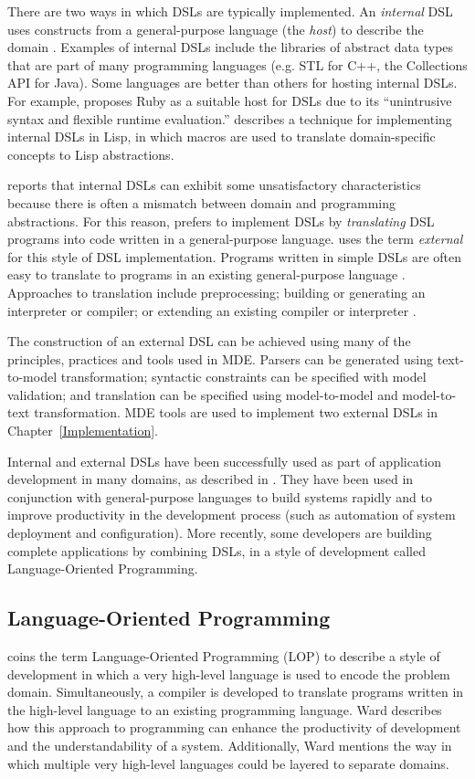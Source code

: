 There are two ways in which DSLs are typically implemented. An \emph{internal} DSL uses constructs from a general-purpose language (the \emph{host}) to describe the domain \cite{dmitriev04lop,fowler10dsls}. Examples of internal DSLs include the libraries of abstract data types that are part of many programming languages (e.g. STL for C++, the Collections API for Java). Some languages are better than others for hosting internal DSLs. For example, \cite{fowler05language} proposes Ruby as a suitable host for DSLs due to its ``unintrusive syntax and flexible runtime evaluation.'' \cite{graham93lisp} describes a technique for implementing internal DSLs in Lisp, in which macros are used to translate domain-specific concepts to Lisp abstractions.

\cite{dmitriev04lop} reports that internal DSLs can exhibit some unsatisfactory characteristics because there is often a mismatch between domain and programming abstractions. For this reason, \cite{dmitriev04lop} prefers to implement DSLs by \emph{translating} DSL programs into code written in a general-purpose language. \cite{fowler10dsls} uses the term \emph{external} for this style of DSL implementation. Programs written in simple DSLs are often easy to translate to programs in an existing general-purpose language \cite{parr07antlr}. Approaches to translation include preprocessing; building or generating an interpreter or compiler; or extending an existing compiler or interpreter \cite{dmitriev04lop}.

The construction of an external DSL can be achieved using many of the principles, practices and tools used in MDE. Parsers can be generated using text-to-model transformation; syntactic constraints can be specified with model validation; and translation can be specified using model-to-model and model-to-text transformation. MDE tools are used to implement two external DSLs in Chapter~\ref{Implementation}.

Internal and external DSLs have been successfully used as part of application development in many domains, as described in \cite{deursen00dslbib}. They have been used in conjunction with general-purpose languages to build systems rapidly and to improve productivity in the development process (such as automation of system deployment and configuration). More recently, some developers are building complete applications by combining DSLs, in a style of development called Language-Oriented Programming. 

\subsection{Language-Oriented Programming}
\cite{ward94lop} coins the term Language-Oriented Programming (LOP) to describe a style of development in which a very high-level language is used to encode the problem domain. Simultaneously, a compiler is developed to translate programs written in the high-level language to an existing programming language. Ward describes how this approach to programming can enhance the productivity of development and the understandability of a system. Additionally, Ward mentions the way in which multiple very high-level languages could be layered to separate domains.

